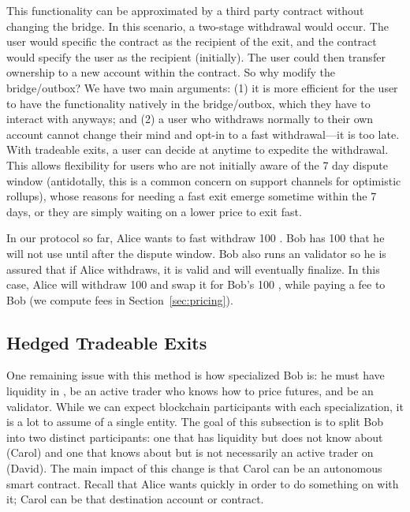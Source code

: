 This functionality can be approximated by a third party \layerone contract without changing the bridge. In this scenario, a two-stage withdrawal would occur. The user would specific the contract as the recipient of the exit, and the contract would specify the user as the recipient (initially). The user could then transfer ownership to a new account within the contract. So why modify the bridge/outbox? We have two main arguments: (1) it is more efficient for the user to have the functionality natively in the bridge/outbox, which they have to interact with anyways; and (2) a user who withdraws normally to their own account cannot change their mind and opt-in to a fast withdrawal---it is too late. With tradeable exits, a user can decide at anytime to expedite the withdrawal. This allows flexibility for users who are not initially aware of the 7 day dispute window (antidotally, this is a common concern on support channels for optimistic rollups), whose reasons for needing a fast exit emerge sometime within the 7 days, or they are simply waiting on a lower price to exit fast.

In our protocol so far, Alice wants to fast withdraw 100 \ethtwo. Bob has 100 \ethone that he will not use until after the dispute window. Bob also runs an \layertwo validator so he is assured that if Alice withdraws, it is valid and will eventually finalize. In this case, Alice will withdraw 100 \ethxx and swap it for Bob's 100 \ethone, while paying a fee to Bob (we compute fees in Section~\ref{sec:pricing}).  

\subsection{Hedged Tradeable Exits}

One remaining issue with this method is how specialized Bob is: he must have liquidity in \ethone, be an active trader who knows how to price futures, and be an \layertwo validator. While we can expect blockchain participants with each specialization, it is a lot to assume of a single entity. The goal of this subsection is to split Bob into two distinct participants: one that has \ethone liquidity but does not know about \layertwo (Carol) and one that knows about \layertwo but is not necessarily an active trader on \layerone (David). The main impact of this change is that Carol can be an autonomous \layerone smart contract. Recall that Alice wants \ethone quickly in order to do something on \layerone with it; Carol can be that destination account or contract.

